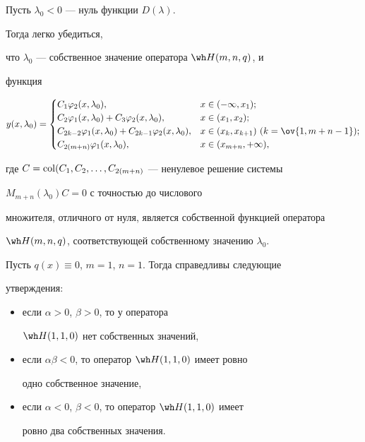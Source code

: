  


Пусть $\lambda_0<0$ --- нуль функции $D(\lambda)$. 


Тогда легко убедиться, 


что $\lambda_0$ --- собственное значение оператора $\wh H(m,n,q)$, и 


функция 


$$ 


y(x,\lambda_0)= 


\begin{cases} 


C_1\varphi_2(x,\lambda_0), & x\in(-\infty,x_1); \\ 


C_2\varphi_1(x,\lambda_0)+C_3\varphi_2(x,\lambda_0), 


& x\in(x_1,x_2); \\ 


C_{2k-2}\varphi_1(x,\lambda_0)+C_{2k-1}\varphi_2(x,\lambda_0), 


& x\in(x_k,x_{k+1}) \ (k=\ov{1,m+n-1}); \\ 


C_{2(m+n)}\varphi_1(x,\lambda_0), & x\in(x_{m+n},+\infty), 


\end{cases} 


$$ 


где $C=\operatorname{col}(C_1,C_2,\dotsc,C_{2(m+n)}$ --- ненулевое решение системы 


$M_{m+n}(\lambda_0)C=0$ с точностью до числового 


множителя, отличного от нуля, является собственной функцией оператора 


$\wh H(m,n,q)$, соответствующей собственному значению $\lambda_0$. 


 


\begin{thm} 


Пусть $q(x)\equiv 0$, $m=1$, $n=1$. Тогда справедливы следующие 


утверждения$:$ 


\begin{itemize} 


\item[a)] если $\alpha>0$, $\beta>0$, то у оператора 


$\wh H(1,1,0)$ нет собственных значений, 


\item[б)] если $\alpha\beta<0$, то оператор $\wh H(1,1,0)$ имеет ровно 


одно собственное значение, 


\item[в)] если $\alpha<0$, $\beta<0$, то оператор $\wh H(1,1,0)$ имеет 


ровно два собственных значения. 


\end{itemize} 


\end{thm} 


